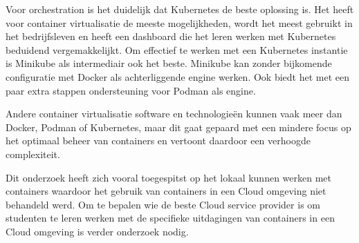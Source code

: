 Voor orchestration is het duidelijk dat Kubernetes de beste oplossing is. Het heeft voor container virtualisatie de meeste mogelijkheden, wordt het meest gebruikt in het bedrijfsleven en heeft een dashboard die het leren werken met Kubernetes beduidend vergemakkelijkt. Om effectief te werken met een Kubernetes instantie is Minikube als intermediair ook het beste. Minikube kan zonder bijkomende configuratie met Docker als achterliggende engine werken. Ook biedt het met een paar extra stappen ondersteuning voor Podman als engine.

Andere container virtualisatie software en technologieën kunnen vaak meer dan Docker, Podman of Kubernetes, maar dit gaat gepaard met een mindere focus op het optimaal beheer van containers en vertoont daardoor een verhoogde complexiteit.

Dit onderzoek heeft zich vooral toegespitst op het lokaal kunnen werken met containers waardoor het gebruik van containers in een Cloud omgeving niet behandeld werd. Om te bepalen wie de beste Cloud service provider is om studenten te leren werken met de specifieke uitdagingen van containers in een Cloud omgeving is verder onderzoek nodig.



